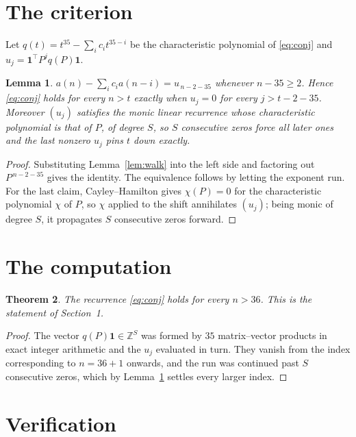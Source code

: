 \documentclass[11pt,a4paper]{article}
\theoremstyle{plain}
\newtheorem{theorem}{Theorem}
\newtheorem{lemma}[theorem]{Lemma}
\theoremstyle{definition}
\begin{document}
\section{The criterion}

Let $q(t)=t^{35}-\sum_i c_i t^{35-i}$ be the characteristic polynomial of
\eqref{eq:conj} and $u_j=\mathbf{1}^{\!\top}P^{j}q(P)\mathbf{1}$.

\begin{lemma}\label{lem:crit}
$a(n)-\sum_i c_i a(n-i)=u_{\,n-2-35}$ whenever $n-35\ge2$. Hence
\eqref{eq:conj} holds for every $n>t$ exactly when $u_j=0$ for every
$j>t-2-35$. Moreover $(u_j)$ satisfies the monic linear recurrence whose
characteristic polynomial is that of $P$, of degree $S$, so $S$ consecutive zeros force all
later ones and the last nonzero $u_j$ pins $t$ down exactly.
\end{lemma}

\begin{proof}
Substituting Lemma~\ref{lem:walk} into the left side and factoring out
$P^{\,n-2-35}$ gives the identity. The equivalence follows by letting the exponent
run. For the last claim, Cayley--Hamilton gives $\chi(P)=0$ for the characteristic
polynomial $\chi$ of $P$, so $\chi$ applied to the shift annihilates $(u_j)$; being monic of
degree $S$, it propagates $S$ consecutive zeros forward.
\end{proof}

\section{The computation}

\begin{theorem}
The recurrence \eqref{eq:conj} holds for every $n>36$. This is the statement of
Section~1.
\end{theorem}

\begin{proof}
The vector $q(P)\mathbf{1}\in\mathbb{Z}^{S}$ was formed by $35$ matrix--vector
products in exact integer arithmetic and the $u_j$ evaluated in turn. They vanish from the
index corresponding to $n=36+1$ onwards, and the run was continued past $S$ consecutive
zeros, which by Lemma~\ref{lem:crit} settles every larger index.
\end{proof}

\section{Verification}
\end{document}
